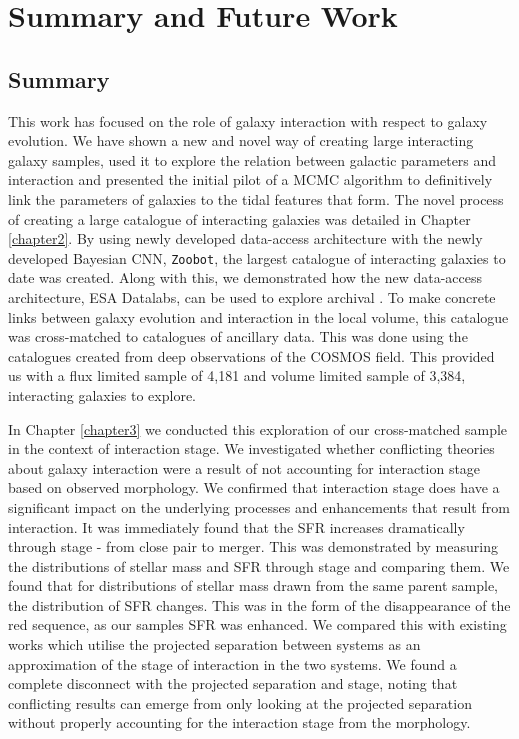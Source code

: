 \chapter{Summary and Future Work}\label{chapter:conclusion}
\section{Summary}
\noindent This work has focused on the role of galaxy interaction with respect to galaxy evolution. We have shown a new and novel way of creating large interacting galaxy samples, used it to explore the relation between galactic parameters and interaction and presented the initial pilot of a MCMC algorithm to definitively link the parameters of galaxies to the tidal features that form. The novel process of creating a large catalogue of interacting galaxies was detailed in Chapter \ref{chapter2}. By using newly developed data-access architecture with the newly developed Bayesian CNN, \texttt{Zoobot}, the largest catalogue of interacting galaxies to date was created. Along with this, we demonstrated how the new data-access architecture, ESA Datalabs, can be used to explore archival \DIFdelbegin {}\DIFdelend \DIFaddbegin {}\DIFaddend . To make concrete links between galaxy evolution and interaction in the local volume, this catalogue was cross-matched to catalogues of ancillary data. This was done using the catalogues created from deep observations of the COSMOS field. This provided us with a flux limited sample of 4,181 and volume limited sample of 3,384, interacting galaxies to explore.

In Chapter \ref{chapter3} we conducted this exploration of our cross-matched sample in the context of interaction stage. We investigated whether conflicting theories about galaxy interaction were a result of not accounting for interaction stage based on observed morphology. We confirmed that interaction stage does have a significant impact on the underlying processes and enhancements that result from interaction. It was immediately found that the SFR increases dramatically through stage - from close pair to merger. This was demonstrated by measuring the distributions of stellar mass and SFR through stage and comparing them. We found that for distributions of stellar mass drawn from the same parent sample, the distribution of SFR changes\DIFdelbegin {}\DIFdelend . This was in the form of the disappearance of the red sequence, as our samples SFR was enhanced. We compared this with existing works which utilise the projected separation between systems as an approximation of the stage of interaction in the two systems. We found a complete disconnect with the projected separation and stage, noting that conflicting results can emerge from only looking at the projected separation without properly accounting for the interaction stage from the morphology. 


